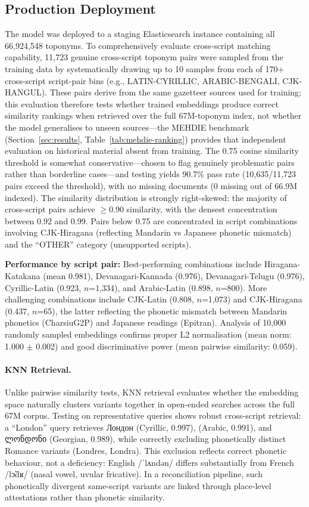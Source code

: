 \documentclass[11pt,a4paper]{article}
\newcommand{\textar}[1]{{\arabicfont\RL{#1}}}
\newcommand{\textgeorgian}[1]{{\georgianfont #1}}
\begin{document}
\subsection{Production Deployment}

The model was deployed to a staging Elasticsearch instance containing all 66,924,548 toponyms. To comprehensively evaluate cross-script matching capability, 11,723 genuine cross-script toponym pairs were sampled from the training data by systematically drawing up to 10 samples from each of 170+ cross-script script-pair bins (e.g., LATIN-CYRILLIC, ARABIC-BENGALI, CJK-HANGUL). These pairs derive from the same gazetteer sources used for training; this evaluation therefore tests whether trained embeddings produce correct similarity rankings when retrieved over the full 67M-toponym index, not whether the model generalises to unseen sources---the MEHDIE benchmark (Section~\ref{sec:results}, Table~\ref{tab:mehdie-ranking}) provides that independent evaluation on historical material absent from training. The 0.75 cosine similarity threshold is somewhat conservative---chosen to flag genuinely problematic pairs rather than borderline cases---and testing yields 90.7\% pass rate (10,635/11,723 pairs exceed the threshold), with no missing documents (0 missing out of 66.9M indexed). The similarity distribution is strongly right-skewed: the majority of cross-script pairs achieve $\geq$0.90 similarity, with the densest concentration between 0.92 and 0.99. Pairs below 0.75 are concentrated in script combinations involving CJK-Hiragana (reflecting Mandarin vs Japanese phonetic mismatch) and the ``OTHER'' category (unsupported scripts).

\textbf{Performance by script pair:} Best-performing combinations include Hiragana-Katakana (mean 0.981), Devanagari-Kannada (0.976), Devanagari-Telugu (0.976), Cyrillic-Latin (0.923, $n$=1,334), and Arabic-Latin (0.898, $n$=800). More challenging combinations include CJK-Latin (0.808, $n$=1,073) and CJK-Hiragana (0.437, $n$=65), the latter reflecting the phonetic mismatch between Mandarin phonetics (CharsiuG2P) and Japanese readings (Epitran). Analysis of 10,000 randomly sampled embeddings confirms proper L2 normalisation (mean norm: 1.000 $\pm$ 0.002) and good discriminative power (mean pairwise similarity: 0.059).

\paragraph{KNN Retrieval.} Unlike pairwise similarity tests, KNN retrieval evaluates whether the embedding space naturally clusters variants together in open-ended searches across the full 67M corpus. Testing on representative queries shows robust cross-script retrieval: a ``London'' query retrieves Лондон (Cyrillic, 0.997), \textar{لندون} (Arabic, 0.991), and \textgeorgian{ლონდონი} (Georgian, 0.989), while correctly excluding phonetically distinct Romance variants (Londres, Londra). This exclusion reflects correct phonetic behaviour, not a deficiency: English /ˈlʌndən/ differs substantially from French /lɔ̃dʁ/ (nasal vowel, uvular fricative). In a reconciliation pipeline, such phonetically divergent same-script variants are linked through place-level attestations rather than phonetic similarity.
\end{document}
